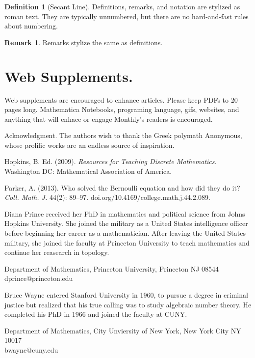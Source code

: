 \documentclass{article}
\theoremstyle{theorem}
\theoremstyle{definition}
\newtheorem*{definition}{Definition}
\newtheorem*{remark}{Remark}
\begin{document}
\begin{definition}[Secant Line]
Definitions, remarks, and notation are stylized as roman text.  They are typically unnumbered, but there are no hard-and-fast rules about numbering.
\end{definition}

\begin{remark}
Remarks stylize the same as definitions.
\end{remark}

\section{Web Supplements.} Web supplements are encouraged to enhance articles.  Please keep PDFs to 20 pages long.  Mathematica Notebooks, programing language, gifs, websites, and anything that will enhace or engage {\sc Monthly}'s readers is encouraged.


\begin{acknowledgment}{Acknowledgment.}
The authors wish to thank the Greek polymath Anonymous, whose prolific works are an endless source of inspiration.
\end{acknowledgment}

\begin{thebibliography}{2}
 Hopkins, B. Ed. (2009). \textit{Resources for Teaching Discrete Mathematics.} Washington DC: Mathematical Association of America.

 Parker, A. (2013). Who solved the Bernoulli equation and how did they do it? \textit{Coll. Math. J.} 44(2): 89--97. doi.org/10.4169/college.math.j.44.2.089.

\end{thebibliography}

\begin{biog}
\item[Diana Prince] received her PhD in mathematics and political science from Johns Hopkins University. She joined the military as a United States intelligence officer before beginning her career as a mathematician.  After leaving the United States military, she joined the faculty at Princeton University to teach mathematics and continue her reasearch in topology.
\begin{affil}
Department of Mathematics, Princeton University, Princeton NJ 08544\\
dprince@princeton.edu
\end{affil}

\item[Bruce Wayne] entered Stanford University in 1960, to pursue a degree in criminal justice but realized that his true calling was to study algebraic number theory.  He completed his PhD in 1966 and joined the faculty at CUNY.
\begin{affil}
Department of Mathematics, City Unviersity of New York, New York City NY 10017\\
bwayne@cuny.edu
\end{affil}
\end{biog}
\vfill\eject
\end{document}
